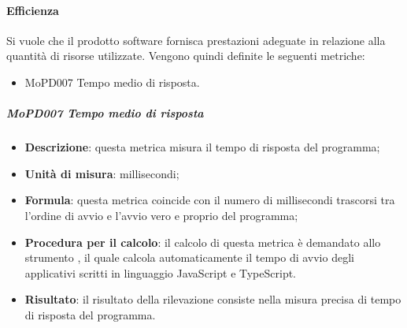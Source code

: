\documentclass[../norme-di-progetto.tex]{subfiles}
\begin{document}
\paragraph{Efficienza}
Si vuole che il prodotto software fornisca prestazioni adeguate in relazione alla quantità di risorse utilizzate. Vengono quindi definite le seguenti metriche:
\begin{itemize}
  \item MoPD007 Tempo medio di risposta.
\end{itemize}
\subparagraph{MoPD007 Tempo medio di risposta}
\begin{itemize}
  \item \textbf{Descrizione}: questa metrica misura il tempo di risposta del programma;
  \item \textbf{Unità di misura}: millisecondi;
  \item \textbf{Formula}: questa metrica coincide con il numero di millisecondi trascorsi tra l'ordine di avvio e l'avvio vero e proprio del programma;
  \item \textbf{Procedura per il calcolo}: il calcolo di questa metrica è demandato allo strumento , il quale calcola automaticamente il tempo di avvio degli applicativi scritti in linguaggio JavaScript e TypeScript.
  \item \textbf{Risultato}: il risultato della rilevazione consiste nella misura precisa di tempo di risposta del programma.
\end{itemize}
\end{document}
